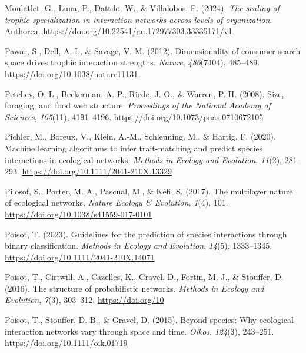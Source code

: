 \documentclass[
]{article}
\newlength{\cslhangindent}
\newenvironment{CSLReferences}[2] %
 {\begin{list}{}{%
  \setlength{\itemindent}{0pt}
  \setlength{\leftmargin}{0pt}
  \setlength{\parsep}{0pt}
  \ifodd #1
   \setlength{\leftmargin}{\cslhangindent}
   \setlength{\itemindent}{-1\cslhangindent}
  \fi
  \setlength{\itemsep}{#2\baselineskip}}}
 {\end{list}}
\begin{document}
\begin{CSLReferences}{1}{0}
Moulatlet, G., Luna, P., Dattilo, W., \& Villalobos, F. (2024).
\emph{The scaling of trophic specialization in interaction networks
across levels of organization}. Authorea.
\url{https://doi.org/10.22541/au.172977303.33335171/v1}

Pawar, S., Dell, A. I., \& Savage, V. M. (2012). Dimensionality of
consumer search space drives trophic interaction strengths.
\emph{Nature}, \emph{486}(7404), 485--489.
\url{https://doi.org/10.1038/nature11131}

Petchey, O. L., Beckerman, A. P., Riede, J. O., \& Warren, P. H. (2008).
Size, foraging, and food web structure. \emph{Proceedings of the
National Academy of Sciences}, \emph{105}(11), 4191--4196.
\url{https://doi.org/10.1073/pnas.0710672105}

Pichler, M., Boreux, V., Klein, A.-M., Schleuning, M., \& Hartig, F.
(2020). Machine learning algorithms to infer trait-matching and predict
species interactions in ecological networks. \emph{Methods in Ecology
and Evolution}, \emph{11}(2), 281--293.
\url{https://doi.org/10.1111/2041-210X.13329}

Pilosof, S., Porter, M. A., Pascual, M., \& Kéfi, S. (2017). The
multilayer nature of ecological networks. \emph{Nature Ecology \&
Evolution}, \emph{1}(4), 101.
\url{https://doi.org/10.1038/s41559-017-0101}

Poisot, T. (2023). Guidelines for the prediction of species interactions
through binary classification. \emph{Methods in Ecology and Evolution},
\emph{14}(5), 1333--1345. \url{https://doi.org/10.1111/2041-210X.14071}

Poisot, T., Cirtwill, A., Cazelles, K., Gravel, D., Fortin, M.-J., \&
Stouffer, D. (2016). The structure of probabilistic networks.
\emph{Methods in Ecology and Evolution}, \emph{7}(3), 303--312.
\url{https://doi.org/10}

Poisot, T., Stouffer, D. B., \& Gravel, D. (2015). Beyond species: Why
ecological interaction networks vary through space and time.
\emph{Oikos}, \emph{124}(3), 243--251.
\url{https://doi.org/10.1111/oik.01719}


\end{CSLReferences}
\end{document}
